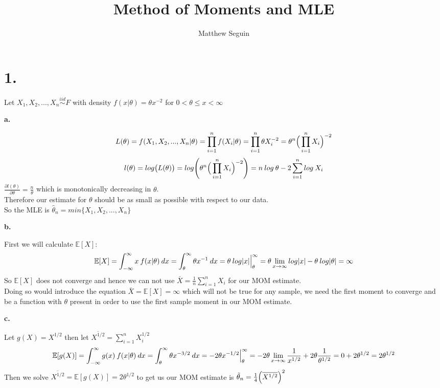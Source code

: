 \documentclass{article}
\title{Method of Moments and MLE}
\author{Matthew Seguin}
\date{}
\begin{document}
\maketitle

\section*{1.}
\begin{center}
\doublespacing
    Let $X_1, X_2, ..., X_n\overset{iid}{\sim} F$ with density $f(x |\theta ) =\theta x^{-2}$ for $0 <\theta\leq x <\infty$
\end{center}

{\Large\textbf{a.}}
\begin{center}
\doublespacing
    \[L (\theta) = f(X_1, X_2, ..., X_n |\theta) =\prod_{i=1}^n f(X_i |\theta) =\prod_{i=1}^n\theta X_i^{-2} =\theta^n\Big{(}\prod_{i=1}^n X_i\Big{)}^{-2}\]
    \[l(\theta) = log\big{(} L(\theta)\big{)} = log\Bigg{(}\theta^n\Big{(}\prod_{i=1}^n X_i\Big{)}^{-2}\Bigg{)} = n\:log\:\theta - 2\sum_{i=1}^n log\:X_i\]
    $\frac{\partial l(\theta)}{\partial\theta} =\frac{n}{\theta}$ which is monotonically decreasing in $\theta$.
    \\Therefore our estimate for $\theta$ should be as small as possible with respect to our data.
    \\So the MLE is $\hat{\theta}_n = min\{X_1, X_2, ..., X_n\}$ \qedsymbol
\end{center}

{\Large\textbf{b.}}
\begin{center}
\doublespacing
    First we will calculate $\mathbb{E}[X]$:
    \[\mathbb{E}[X] =\int_{-\infty}^\infty x\:f(x |\theta)\:dx =\int_\theta^\infty\theta x^{-1}\:dx =\theta\:log|x|\Big{|}_\theta^\infty =\theta\lim_{x\rightarrow\infty}log|x| -\theta\:log|\theta| =\infty\]
    So $\mathbb{E}[X]$ does not converge and hence we can not use $\bar{X} =\frac{1}{n}\sum_{i=1}^n X_i$ for our MOM estimate.
    \\Doing so would introduce the equation $\bar{X} =\mathbb{E}[X] =\infty$ which will not be true for any sample, we need the first moment to converge and be a function with $\theta$ present in order to use the first sample moment in our MOM estimate.
\end{center}

{\Large\textbf{c.}}
\begin{center}
\doublespacing
    Let $g(X) = X^{1/2}$ then let $\overline{X^{1/2}} =\sum_{i=1}^n X_i^{1/2}$
    \[\mathbb{E}[g(X)] =\int_{-\infty}^\infty g(x)\:f(x |\theta)\:dx =\int_\theta^\infty\theta x^{-3/2}\:dx = -2\theta x^{-1/2}\Big{|}_\theta^\infty = -2\theta\lim_{x\rightarrow\infty}\frac{1}{x^{1/2}} + 2\theta\frac{1}{\theta^{1/2}} = 0 + 2\theta^{1/2} = 2\theta^{1/2}\]
    Then we solve $\overline{X^{1/2}} =\mathbb{E}[g(X)] = 2\theta^{1/2}$ to get us our MOM estimate is $\tilde{\theta}_n =\frac{1}{4}\Big{(}\overline{X^{1/2}}\Big{)}^2$ \qedsymbol
\end{center}
\end{document}
